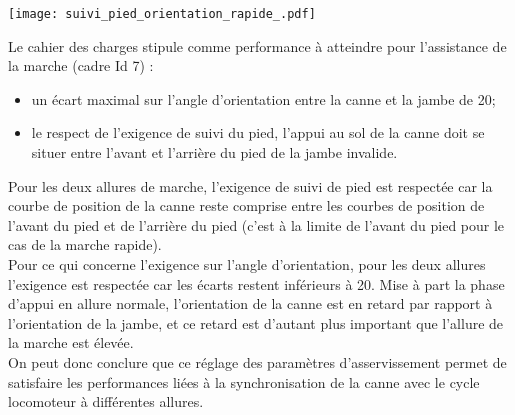 \begin{multicols}{2}
\begin{center}%
\texttt{[image: suivi\_pied\_orientation\_rapide\_.pdf]}
\end{center}


\fi


\ifprof
\begin{corrige}
Le cahier des charges stipule comme performance à atteindre pour l'assistance de la marche (cadre Id 7) :\\
\begin{itemize}
\item un écart maximal sur l'angle d'orientation entre la canne et la jambe de 20\degres;
\item le respect de l'exigence de suivi du pied, l'appui au sol de la canne doit se situer entre l'avant et l'arrière du pied de la jambe invalide.\\
\end{itemize}
Pour les deux allures de marche, l'exigence de suivi de pied est respectée car la courbe de position de la canne reste comprise entre les courbes de position de l'avant du pied et de l'arrière du pied (c'est à la limite de l'avant du pied pour le cas de la marche rapide).\\
Pour ce qui concerne l'exigence sur l'angle d'orientation, pour les deux allures l'exigence est respectée car les écarts restent inférieurs à 20\degre. Mise à part la phase d'appui en allure normale, l'orientation de la canne est en retard par rapport à l'orientation de la jambe, et ce retard est d'autant plus important que l'allure de la marche est élevée.\\
On peut donc conclure que ce réglage des paramètres d'asservissement permet de satisfaire les performances liées à la synchronisation de la canne avec le cycle locomoteur à différentes allures.
\end{corrige}
\fi




\ifprof
\else

\end{multicols}
